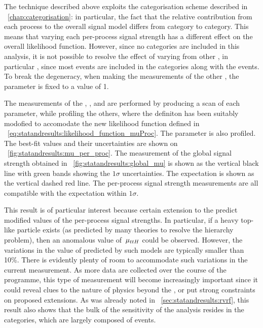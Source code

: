 The technique described above exploits the categorisation scheme described in \Chapter~\ref{chap:categorisation}: in particular, the fact that the relative contribution from each process to the overall signal model differs from category to category. This means that varying each per-process signal strength has a different effect on the overall likelihood function. However, since no \VHTag categories are included in this analysis, it is not possible to resolve the effect of varying \muVH from other \POI\s, in particular \muggH, since most \VH events are included in the \Untagged categories along with the \ggH events. To break the degeneracy, when making the measurements of the other \POI\s, the parameter \muVH is fixed to a value of 1. 

The measurements of the \muggH, \muVBF, and \muttH are performed by producing a \DNLL scan of each parameter, while profiling the others, where the \DNLL definiton has been suitably modofied to accomodate the new likelihood function defined in \Eq~\ref{eq:statandresults:likelihood_function_muProc}. The \mH parameter is also profiled. The best-fit values and their uncertainties are shown on \Fig~\ref{fig:statandresults:mu_per_proc}. The measurement of the global signal strength obtained in \Sec~\ref{fig:statandresults:global_mu} is shown as the vertical black line with green bands showing the $1\sigma$ uncertainties. The \SM expectation is shown as the vertical dashed red line. The per-process signal strength measurements are all compatible with the \SM expectation within $1\sigma$. 

This result is of particular interest because certain extension to the \SM predict modified values of the per-process signal strengths. In particular, if a heavy top-like particle exists (as predicted by many theories to resolve the hierarchy problem), then an anomalous value of $\,\mu_{ttH}$ could be observed. However, the variations in the value of \muttH predicted by such models are typically smaller than 10\%. There is evidently plenty of room to accommodate such variations in the current measurement. As more data are collected over the course of the \LHC programme, this type of measurement will become increasingly important since it could reveal clues to the nature of physics beyond the \SM, or put strong constraints on proposed extensions. As was already noted in \Sec~\ref{sec:statandresults:rvrf}, this result also shows that the bulk of the sensitivity of the analysis resides in the \Untagged categories, which are largely composed of \ggH events.

